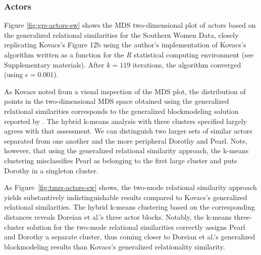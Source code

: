 \documentclass[a4paper,fleqn]{cas-sc}
\begin{document}
\subsubsection{Actors}
Figure \ref{fig:grs-actors-sw} shows the MDS two-dimensional plot of actors based on the generalized relational similarities for the Southern Women Data, closely replicating Kovacs's \citeyearpar{kovacs2010} Figure 12b using the author's implementation of Kovacs's algorithm written as a function for the \textit{R} statistical computing environment (see Supplementary materials). After $k = 119$ iterations, the algorithm converged (using $\epsilon = 0.001$). 

As Kovacs noted from a visual inspection of the MDS plot, the distribution of points in the two-dimensional MDS space obtained using the generalized relational similarities corresponds to the generalized blockmodeling solution reported by \citet{doreian2004}. The hybrid k-means analysis with three clusters specified largely agrees with that assessment. We can distinguish two larger sets of similar actors separated from one another and the more peripheral Dorothy and Pearl. Note, however, that using the generalized relational similarity approach, the k-means clustering misclassifies Pearl as belonging to the first large cluster and puts Dorothy in a singleton cluster. 

As Figure~\ref{fig:tmrs-actors-sw} shows, the two-mode relational similarity approach yields substantively indistinguishable results compared to Kovacs's generalized relational similarities. The hybrid k-means clustering based on the corresponding distances reveals Doreian et al.'s three actor blocks. Notably, the k-means three-cluster solution for the two-mode relational similarities correctly assigns Pearl and Dorothy a separate cluster, thus coming closer to Doreian et al.'s generalized blockmodeling results than Kovacs's generalized relationality similarity. 
\end{document}
